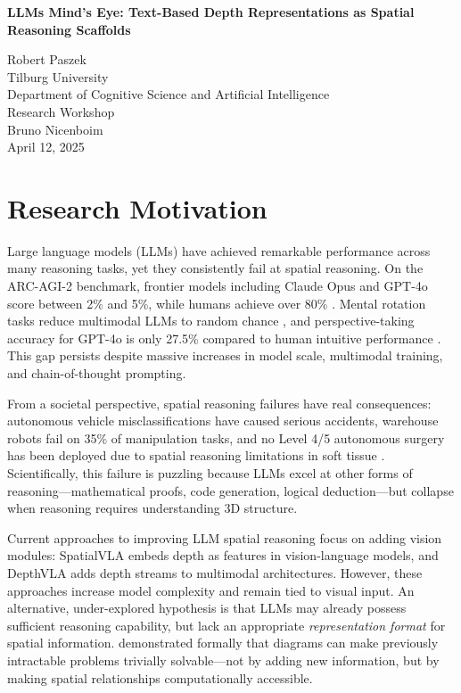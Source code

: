 \documentclass[12pt,a4paper]{article}
\begin{document}
\begin{titlepage}
\centering
\vspace*{\fill}

{\Large\bfseries LLMs Mind's Eye: Text-Based Depth Representations as Spatial Reasoning Scaffolds\par}

\vspace{2cm}

Robert Paszek\\[12pt]
Tilburg University\\
Department of Cognitive Science and Artificial Intelligence\\[12pt]
Research Workshop\\[12pt]
Bruno Nicenboim\\[12pt]
April 12, 2025

\vspace*{\fill}
\end{titlepage}

\section*{Research Motivation}

Large language models (LLMs) have achieved remarkable performance across many reasoning tasks, yet they consistently fail at spatial reasoning. On the ARC-AGI-2 benchmark, frontier models including Claude Opus and GPT-4o score between 2\% and 5\%, while humans achieve over 80\% \cite{chollet2025}. Mental rotation tasks reduce multimodal LLMs to random chance \cite{srivastava2025}, and perspective-taking accuracy for GPT-4o is only 27.5\% compared to human intuitive performance \cite{yang2025}. This gap persists despite massive increases in model scale, multimodal training, and chain-of-thought prompting.

From a societal perspective, spatial reasoning failures have real consequences: autonomous vehicle misclassifications have caused serious accidents, warehouse robots fail on 35\% of manipulation tasks, and no Level 4/5 autonomous surgery has been deployed due to spatial reasoning limitations in soft tissue \cite{yang2025}. Scientifically, this failure is puzzling because LLMs excel at other forms of reasoning---mathematical proofs, code generation, logical deduction---but collapse when reasoning requires understanding 3D structure.

Current approaches to improving LLM spatial reasoning focus on adding vision modules: SpatialVLA embeds depth as features in vision-language models, and DepthVLA adds depth streams to multimodal architectures. However, these approaches increase model complexity and remain tied to visual input. An alternative, under-explored hypothesis is that LLMs may already possess sufficient reasoning capability, but lack an appropriate \emph{representation format} for spatial information.  demonstrated formally that diagrams can make previously intractable problems trivially solvable---not by adding new information, but by making spatial relationships computationally accessible.
\end{document}
